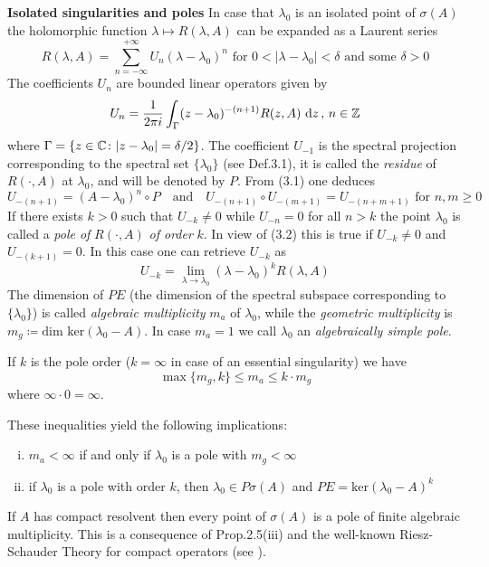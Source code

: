 \begin{example}{\textbf{Isolated singularities and poles}}\label{ex:a3-3.6}
In case that $\lambda_{0}$ is an isolated point of $\sigma(A)$ the holomorphic function $\lambda \mapsto R(\lambda,A)$ can be expanded as a Laurent series
\[
R(\lambda,A) = \sum_{n=-\infty}^{+\infty} U_{n}(\lambda - \lambda_{0})^{n} \text{ for } 0 < |\lambda - \lambda_{0}| < \delta \text{ and some } \delta > 0
\]
The coefficients $U_{n}$ are bounded linear operators given by
\begin{equation}\label{eq:a3-3.1}
U_{n} = \frac{1}{2\pi i}\int_{\Gamma} (z - \lambda_{0})^{-(n+1)}R(z,A) \, \mathop{}\!\mathrm{d}{z} \, , \, n \in \mathbb{Z}
\end{equation}
where $\Gamma = \{z \in \mathbb{C} \colon |z - \lambda_{0}| = \delta/2\}$.
The coefficient $U_{-1}$ is the spectral projection corresponding to the spectral set $\{\lambda_{0}\}$ (see Def.3.1), it is called the \emph{residue} of $R(\cdot,A)$ at $\lambda_{0}$, and will be denoted by $P$.
From (3.1) one deduces
\begin{equation}\label{eq:a3-3.2}
U_{-(n+1)} = (A - \lambda_{0})^{n} \circ P \quad \text{and} \quad U_{-(n+1)} \circ U_{-(m+1)} = U_{-(n+m+1)} \text{ for } n, m \geq 0
\end{equation}
If there exists $k > 0$ such that $U_{-k} \neq 0$ while $U_{-n} = 0$ for all $n > k$ the point $\lambda_{0}$ is called a \emph{pole of} $R(\cdot,A)$ \emph{of order} $k$.
In view of (3.2) this is true if $U_{-k} \neq 0$ and $U_{-(k+1)} = 0$.
In this case one can retrieve $U_{-k}$ as
\begin{equation}\label{eq:a3-3.3}
U_{-k} = \lim_{\lambda \to \lambda_{0}} (\lambda - \lambda_{0})^{k}R(\lambda,A)
\end{equation}
The dimension of $PE$ (\ie the dimension of the spectral subspace corresponding to $\{\lambda_{0}\}$) is called \emph{algebraic multiplicity} $m_{a}$ of $\lambda_{0}$, while the \emph{geometric multiplicity} is $m_{g} \coloneqq \text{dim ker}(\lambda_{0} - A)$.
In case $m_{a} = 1$ we call $\lambda_{0}$ an \emph{algebraically simple pole}.

If $k$ is the pole order ($k = \infty$ in case of an essential singularity) we have
\begin{equation}\label{eq:a3-3.4}
	\max\{m_{g},k\} \leq m_{a} \leq k \cdot m_{g}
\end{equation}
where $\infty \cdot 0 = \infty$.

These inequalities yield the following implications:
\begin{enumerate}[(i)]
\item
$m_{a} < \infty$ if and only if $\lambda_{0}$ is a pole with $m_{g} < \infty$
\item
if $\lambda_{0}$ is a pole with order $k$, then $\lambda_{0} \in P\sigma(A)$ and $PE = \text{ker}(\lambda_{0} - A)^{k}$
\end{enumerate}
If $A$ has compact resolvent then every point of $\sigma(A)$ is a pole of finite algebraic multiplicity.
This is a consequence of Prop.2.5(iii) and the well-known Riesz-Schauder Theory for compact operators (see \citet[VII.4.5]{dunfordschwartz:1958}).
\end{example}
